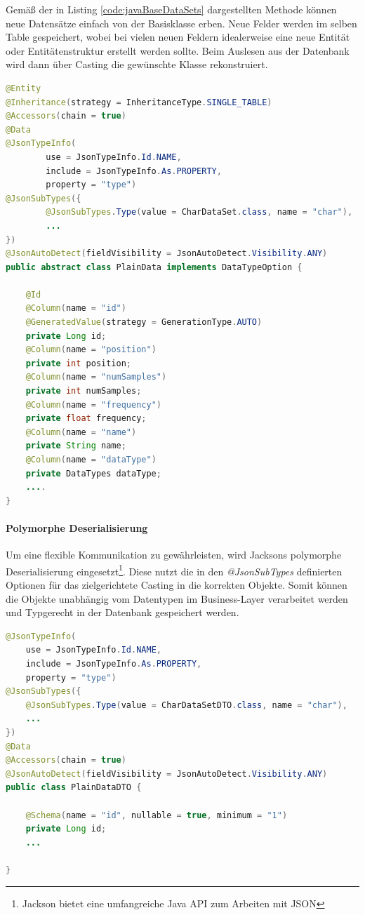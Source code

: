 Gemäß der in Listing \ref*{code:javaBaseDataSets} dargestellten Methode können neue Datensätze einfach von der Basisklasse erben. Neue Felder werden im selben Table gespeichert, wobei bei vielen neuen Feldern 
idealerweise eine neue Entität oder Entitätenstruktur erstellt werden sollte. Beim Auslesen aus der Datenbank wird dann über Casting die gewünschte Klasse rekonstruiert.
\begin{lstlisting}[language=Java, caption=Abstrakte Basisklasse der \textit{DataSets}, label={code:javaBaseDataSets}]
@Entity
@Inheritance(strategy = InheritanceType.SINGLE_TABLE)
@Accessors(chain = true)
@Data
@JsonTypeInfo(
        use = JsonTypeInfo.Id.NAME,
        include = JsonTypeInfo.As.PROPERTY,
        property = "type")
@JsonSubTypes({
        @JsonSubTypes.Type(value = CharDataSet.class, name = "char"),
        ...
})
@JsonAutoDetect(fieldVisibility = JsonAutoDetect.Visibility.ANY)
public abstract class PlainData implements DataTypeOption {

    @Id
    @Column(name = "id")
    @GeneratedValue(strategy = GenerationType.AUTO)
    private Long id;
    @Column(name = "position")
    private int position;
    @Column(name = "numSamples")
    private int numSamples;
    @Column(name = "frequency")
    private float frequency;
    @Column(name = "name")
    private String name;
    @Column(name = "dataType")
    private DataTypes dataType;
    ....
}
\end{lstlisting}




\paragraph{Polymorphe Deserialisierung} Um eine flexible Kommunikation zu gewährleisten, wird Jacksons polymorphe Deserialisierung eingesetzt\footnote{Jackson bietet eine umfangreiche Java API zum Arbeiten mit JSON}. Diese nutzt die in den 
\textit{@JsonSubTypes} definierten Optionen für das zielgerichtete Casting in die korrekten Objekte. Somit können die Objekte unabhängig vom Datentypen im Business-Layer verarbeitet werden und Typgerecht in der Datenbank gespeichert werden.

\begin{lstlisting}[language=Java, caption=Basisklasse der DTO Objekte, label={code:javaBaseDataSetsDTO}]
@JsonTypeInfo(
    use = JsonTypeInfo.Id.NAME,
    include = JsonTypeInfo.As.PROPERTY,
    property = "type")
@JsonSubTypes({
    @JsonSubTypes.Type(value = CharDataSetDTO.class, name = "char"),
    ...
})
@Data
@Accessors(chain = true)
@JsonAutoDetect(fieldVisibility = JsonAutoDetect.Visibility.ANY)
public class PlainDataDTO {

    @Schema(name = "id", nullable = true, minimum = "1")
    private Long id;
    ...
    
}
\end{lstlisting}


